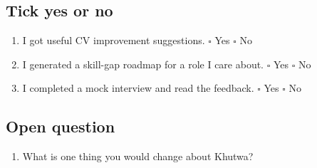 ﻿\documentclass[11pt]{article}
\begin{document}
\subsection*{Tick yes or no}

\begin{enumerate}[start=10]
  \item I got useful CV improvement suggestions. \hfill $\square$ Yes \quad $\square$ No
  \item I generated a skill-gap roadmap for a role I care about. \hfill $\square$ Yes \quad $\square$ No
  \item I completed a mock interview and read the feedback. \hfill $\square$ Yes \quad $\square$ No
\end{enumerate}

\subsection*{Open question}

\begin{enumerate}[start=13]
  \item What is one thing you would change about Khutwa?
\end{enumerate}

\vspace{0.5em}
\noindent\colorbox{boxgray}{\parbox{\dimexpr\linewidth-2\fboxsep}{
  \vspace{2em}\hfill\vspace{2em}
}}

\newpage
\end{document}
